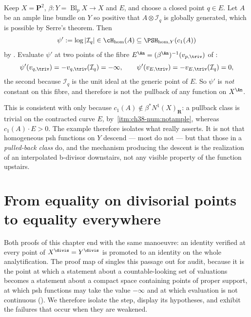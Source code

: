 \begin{example}
\label{ex:ch39-not-fibre-constant}
Keep $X=\mathbf P^2$, $\beta:Y=\operatorname{Bl}_pX\to X$ and $E$, and
choose a closed point $q\in E$.  Let $A$ be an ample line bundle on
$Y$ so positive that $A\otimes\mathcal I_q$ is globally generated, which
is possible by Serre's theorem.  Then
\[
 \psi':=\log|\mathcal I_q|\in\cH_{\mathrm{hom}}(A)
 \subseteq\PSH_{\mathrm{hom},Y}(c_1(A))
\]
by .  Evaluate $\psi'$ at two points of the fibre
$E^{\An}=(\beta^{\An})^{-1}(v_{p,\triv})$ of :
\[
 \psi'(v_{q,\triv})=-v_{q,\triv}(\mathcal I_q)=-\infty,
 \qquad
 \psi'(v_{E,\triv})=-v_{E,\triv}(\mathcal I_q)=0,
\]
the second because $\mathcal I_q$ is the unit ideal at the generic point
of $E$.  So $\psi'$ is \emph{not} constant on this fibre, and therefore
is not the pullback of any function on $X^{\An}$.

This is consistent with  only because
$c_1(A)\notin\beta^*N^1(X)_{\mathbf R}$: a pullback class is trivial on
the contracted curve $E$, by
\,\cref{itm:ch38-num:notample}, whereas
$c_1(A)\cdot E>0$.  The example therefore isolates what
 really asserts.  It is not that
homogeneous psh functions on $Y$ descend --- most do not --- but that
those in a \emph{pulled-back class} do, and the mechanism producing the
descent is the realization of an interpolated b-divisor downstairs, not any
visible property of the function upstairs.
\end{example}

\section{From equality on divisorial points to equality everywhere}
\label{sec:ch39-determination}

Both proofs of this chapter end with the same manoeuvre: an identity
verified at every point of $X^{\divis}=Y^{\divis}$ is promoted to an
identity on the whole analytification.  The proof map of
 singles this passage out for audit,
because it is the point at which a statement about a countable-looking set
of valuations becomes a statement about a compact space containing points of
proper support, at which psh functions may take the value $-\infty$ and at
which evaluation is not continuous
().  We therefore isolate the step,
display its hypotheses, and exhibit the failures that occur when they are
weakened.

